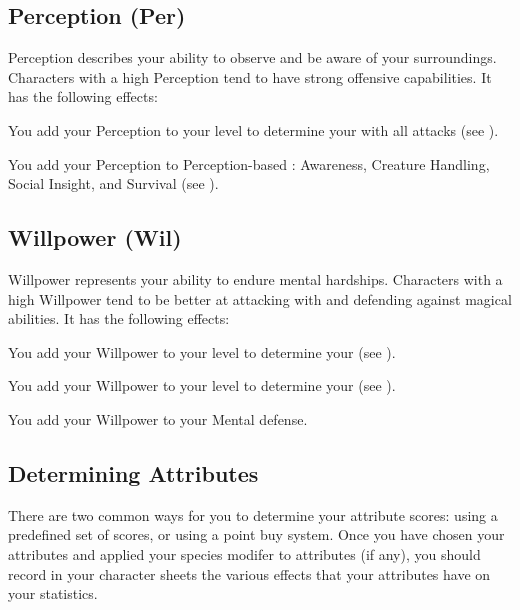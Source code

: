     \subsection{Perception (Per)}\label{Perception}
        {
            Perception describes your ability to observe and be aware of your surroundings.
            Characters with a high Perception tend to have strong offensive capabilities.
            It has the following effects:
            \begin{raggeditemize}
                \item You add your Perception to your level to determine your  with all attacks (see ).
                \item You add your Perception to Perception-based : Awareness, Creature Handling, Social Insight, and Survival (see ).
            \end{raggeditemize}
        }

    \subsection{Willpower (Wil)}\label{Willpower}
        {
            Willpower represents your ability to endure mental hardships.
            Characters with a high Willpower tend to be better at attacking with and defending against magical abilities.
            It has the following effects:
            \begin{raggeditemize}
                \item You add your Willpower to your level to determine your  (see ).
                \item You add your Willpower to your level to determine your  (see ).
                \item You add your Willpower to your Mental defense.
            \end{raggeditemize}
        }


    \subsection{Determining Attributes}\label{Determining Attributes}
        There are two common ways for you to determine your attribute scores: using a predefined set of scores, or using a point buy system.
        Once you have chosen your attributes and applied your species modifer to attributes (if any), you should record in your character sheets the various effects that your attributes have on your statistics.


